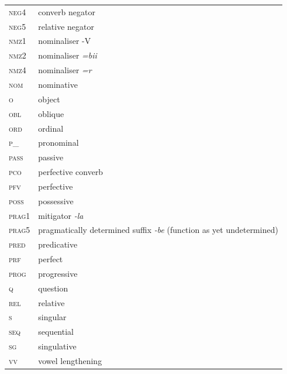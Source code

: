 \documentclass[output=paper,colorlinks,citecolor=brown]{langscibook}
\begin{document}
\begin{tabularx}{.45\textwidth}{lQ}
\textsc{neg4} & converb negator\\
\textsc{neg5} & relative negator\\
\textsc{nmz1} & nominaliser -V\\
\textsc{nmz2} & nominaliser \textit{=bii}\\
\textsc{nmz4} & nominaliser \textit{=r}\\
\textsc{nom} & nominative\\
\textsc{o} & object\\
\textsc{obl} & oblique\\
\textsc{ord} & ordinal\\
\textsc{p\_} & pronominal\\
\textsc{pass} & passive\\
\textsc{pco} & perfective converb\\
\textsc{pfv} & perfective\\
\textsc{poss} & possessive\\
\textsc{prag1} & mitigator \textit{{}-la}\\
\textsc{prag5} & pragmatically determined suffix \textit{{}-be }(function as yet undetermined)\\
\textsc{pred} & predicative\\
\textsc{prf} & perfect\\
\textsc{prog} & progressive\\
\textsc{q} & question\\
\textsc{rel} & relative\\
\textsc{s} & singular\\
\textsc{seq} & sequential\\
\textsc{sg} & singulative\\
\textsc{vv} & vowel lengthening\\
\end{tabularx}

\sloppy\printbibliography[heading=subbibliography,notkeyword=this]
\end{document}
